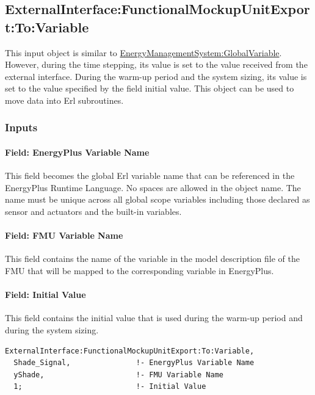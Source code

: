 \subsection{ExternalInterface:FunctionalMockupUnitExport:To:Variable}\label{externalinterfacefunctionalmockupunitexporttovariable}

This input object is similar to \hyperref[energymanagementsystemglobalvariable]{EnergyManagementSystem:GlobalVariable}. However, during the time stepping, its value is set to the value received from the external interface. During the warm-up period and the system sizing, its value is set to the value specified by the field initial value. This object can be used to move data into Erl subroutines.

\subsubsection{Inputs}\label{inputs-12-004}

\paragraph{Field: EnergyPlus Variable Name}\label{field-energyplus-variable-name-7}

This field becomes the global Erl variable name that can be referenced in the EnergyPlus Runtime Language. No spaces are allowed in the object name. The name must be unique across all global scope variables including those declared as sensor and actuators and the built-in variables.

\paragraph{Field: FMU Variable Name}\label{field-fmu-variable-name-7}

This field contains the name of the variable in the model description file of the FMU that will be mapped to the corresponding variable in EnergyPlus.

\paragraph{Field: Initial Value}\label{field-initial-value-8}

This field contains the initial value that is used during the warm-up period and during the system sizing.

\begin{lstlisting}
ExternalInterface:FunctionalMockupUnitExport:To:Variable,
  Shade_Signal,               !- EnergyPlus Variable Name
  yShade,                     !- FMU Variable Name
  1;                          !- Initial Value
\end{lstlisting}